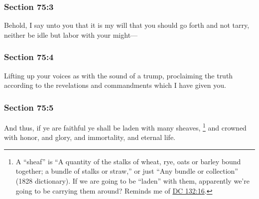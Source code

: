 	\subsubsection{Section 75:3} %
		\label{DC75-3}

		Behold, I say unto you that it is my will that you should go forth and not tarry, neither be idle but labor with your might---


	\subsubsection{Section 75:4} %
		\label{DC75-4}

		Lifting up your voices as with the sound of a trump, proclaiming the truth according to the revelations and commandments which I have given you.


	\subsubsection{Section 75:5} %
		\label{DC75-5}

		And thus, if ye are faithful ye shall be laden with many sheaves,%
			\footnote{%
				A ``sheaf'' is ``A quantity of the stalks of wheat, rye, oats or barley bound together; a bundle of stalks or straw,'' or just ``Any bundle or collection'' (1828 dictionary). If we are going to be ``laden'' with them, apparently we're going to be carrying them around? Reminds me of \hyperref[DC132-16]{DC 132:16}.
				}
		and crowned with honor, and glory, and immortality, and eternal life.

